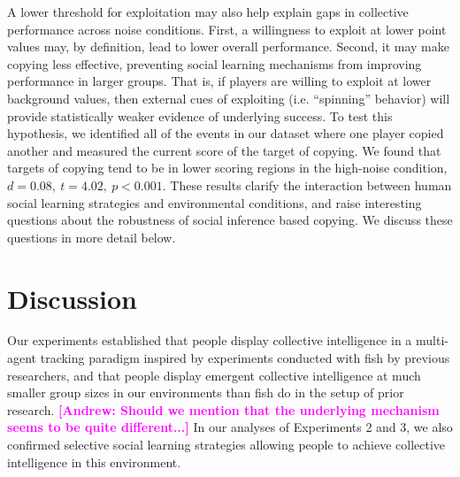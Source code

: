 \documentclass[12pt,letterpaper]{article}
\newcommand{\andrew}[1]{\textcolor{magenta}{\bf [Andrew: #1]}}
\begin{document}
A lower threshold for exploitation may also help explain gaps in collective performance across noise conditions. 
First, a willingness to exploit at lower point values may, by definition, lead to lower overall performance. 
Second, it may make copying less effective, preventing social learning mechanisms from improving performance in larger groups.
That is, if players are willing to exploit at lower background values, then external cues of exploiting (i.e. ``spinning'' behavior) will provide statistically weaker evidence of underlying success.
To test this hypothesis, we identified all of the events in our dataset where one player copied another and measured the current score of the target of copying.
We found that targets of copying tend to be in lower scoring regions in the high-noise condition, $d=0.08,~t=4.02,~p<0.001$.
These results clarify the interaction between human social learning strategies and environmental conditions, and raise interesting questions about the robustness of social inference based copying.
We discuss these questions in more detail below.

\section{Discussion}

Our experiments established that people display collective intelligence in a multi-agent tracking paradigm inspired by experiments conducted with fish by previous researchers, and that people display emergent collective intelligence at much smaller group sizes in our environments than fish do in the setup of prior research. \andrew{Should we mention that the underlying mechanism seems to be quite different...}  In our analyses of Experiments 2 and 3, we also confirmed selective social learning strategies allowing people to achieve collective intelligence in this environment.
\end{document}
